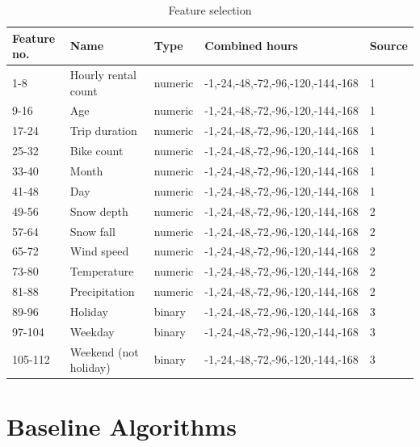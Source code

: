 \begin{table}[]
\centering
\caption{Feature selection}
\label{datacombo}
\begin{tabular}{||l|l|l|l|l||}
\hline
Feature no. & Name                  & Type    & Combined hours                      & Source \\ \hline \hline
1-8         & Hourly rental count   & numeric & -1,-24,-48,-72,-96,-120,-144,-168 & 1      \\ \hline
9-16       & Age                   & numeric & -1,-24,-48,-72,-96,-120,-144,-168 & 1      \\ \hline
17-24       & Trip duration         & numeric & -1,-24,-48,-72,-96,-120,-144,-168 & 1      \\ \hline
25-32       & Bike count            & numeric & -1,-24,-48,-72,-96,-120,-144,-168 & 1      \\ \hline
33-40       & Month                 & numeric & -1,-24,-48,-72,-96,-120,-144,-168 & 1      \\ \hline
41-48       & Day                   & numeric & -1,-24,-48,-72,-96,-120,-144,-168 & 1      \\ \hline
49-56       & Snow depth            & numeric & -1,-24,-48,-72,-96,-120,-144,-168 & 2      \\ \hline
57-64       & Snow fall             & numeric & -1,-24,-48,-72,-96,-120,-144,-168 & 2      \\ \hline
65-72      & Wind speed            & numeric & -1,-24,-48,-72,-96,-120,-144,-168 & 2      \\ \hline
73-80       & Temperature          & numeric & -1,-24,-48,-72,-96,-120,-144,-168 & 2      \\ \hline
81-88       & Precipitation         & numeric & -1,-24,-48,-72,-96,-120,-144,-168 & 2      \\ \hline
89-96     & Holiday               & binary  & -1,-24,-48,-72,-96,-120,-144,-168 & 3      \\ \hline
97-104     & Weekday               & binary  & -1,-24,-48,-72,-96,-120,-144,-168 & 3      \\ \hline
105-112    & Weekend (not holiday) & binary  & -1,-24,-48,-72,-96,-120,-144,-168 & 3      \\ \hline
\end{tabular}
\end{table}


\section {Baseline Algorithms}
\label{BaseAlgos}

